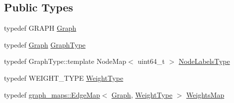 \subsection*{Public Types}
\begin{DoxyCompactItemize}
\item 
typedef G\+R\+A\+P\+H \hyperlink{classnifty_1_1graph_1_1optimization_1_1multicut_1_1MulticutObjective_a1c21fc7303fc25b19dbdf833215a9356}{Graph}
\item 
typedef \hyperlink{classnifty_1_1graph_1_1optimization_1_1multicut_1_1MulticutObjective_a1c21fc7303fc25b19dbdf833215a9356}{Graph} \hyperlink{classnifty_1_1graph_1_1optimization_1_1multicut_1_1MulticutObjective_a4a7b943a30fc6ef52c0debbe245e1fe6}{Graph\+Type}
\item 
typedef Graph\+Type\+::template Node\+Map$<$ uint64\+\_\+t $>$ \hyperlink{classnifty_1_1graph_1_1optimization_1_1multicut_1_1MulticutObjective_ac07bec2c4a1568c3fb99e2018532ad7e}{Node\+Labels\+Type}
\item 
typedef W\+E\+I\+G\+H\+T\+\_\+\+T\+Y\+P\+E \hyperlink{classnifty_1_1graph_1_1optimization_1_1multicut_1_1MulticutObjective_a211aae75aad39550c45919e3d4bb502b}{Weight\+Type}
\item 
typedef \hyperlink{structnifty_1_1graph_1_1graph__maps_1_1EdgeMap}{graph\+\_\+maps\+::\+Edge\+Map}$<$ \hyperlink{classnifty_1_1graph_1_1optimization_1_1multicut_1_1MulticutObjective_a1c21fc7303fc25b19dbdf833215a9356}{Graph}, \hyperlink{classnifty_1_1graph_1_1optimization_1_1multicut_1_1MulticutObjective_a211aae75aad39550c45919e3d4bb502b}{Weight\+Type} $>$ \hyperlink{classnifty_1_1graph_1_1optimization_1_1multicut_1_1MulticutObjective_a3aa13d9db4ea3f97c54f87da9e669d1b}{Weights\+Map}
\end{DoxyCompactItemize}
